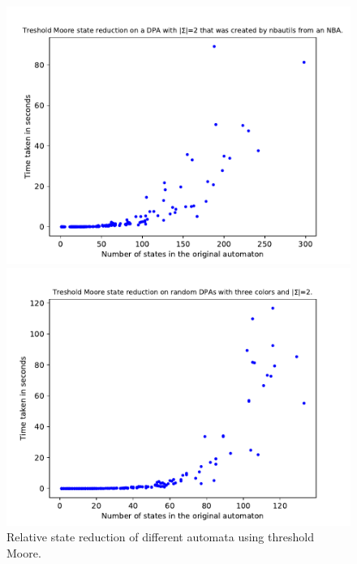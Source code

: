 \begin{figure}
\begin{minipage}{0.49\textwidth}
		\includegraphics[page=6,height=.3\textheight]{../data/analysis/threshold_moore/detnbaut_ap1.pdf} 
		\caption{Relative state reduction of different automata using threshold Moore.}
		\label{exp:fig:threshold_moore_size_hist}
	\end{minipage}
	\hfill
	\begin{minipage}{0.49\textwidth}
		\includegraphics[page=2,height=.3\textheight]{../data/analysis/threshold_moore/gendet_ap1.pdf} 

\end{minipage}
\end{figure}

